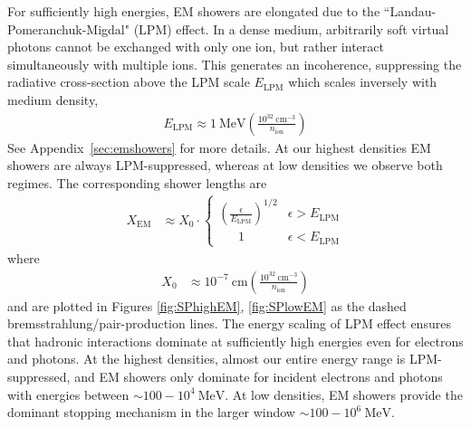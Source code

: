 \documentclass[twocolumn, preprintnumbers,amsmath,amssymb,prd, superscriptaddress]{revtex4}
\newcommand{\MeV}{\text{MeV}}
\def\r{\right)}
\def\l{\left(}
\begin{document}
For sufficiently high energies, EM showers are elongated due to the ``Landau-Pomeranchuk-Migdal" (LPM) effect.
In a dense medium, arbitrarily soft virtual photons cannot be exchanged with only one ion, but rather interact simultaneously with multiple ions.
This generates an incoherence, suppressing the radiative cross-section above the LPM scale $E_\text{LPM}$ which scales inversely with medium density,
\begin{align}
    E_\text{LPM} \approx 1~\MeV
    \l \frac{10^{32}~\text{cm}^{-3}}{n_\text{ion}} \r
\end{align}
See Appendix~\ref{sec:emshowers} for more details.
At our highest densities EM showers are always LPM-suppressed, whereas at low densities we observe both regimes.
The corresponding shower lengths are
\begin{align}
  X_\text{EM} &\approx X_0 \cdot \begin{cases}
  \l \frac{\epsilon}{E_\text{LPM}} \r^{1/2} & \epsilon > E_\text{LPM} \\
  \;\;\;\;\;\, 1 & \epsilon < E_\text{LPM}
  \end{cases}
\end{align}
where
\begin{align}
  X_0 &\approx 10^{-7} ~\text{cm}
  \l\frac{10^{32}~\text{cm}^{-3}}{n_\text{ion}}\r
\end{align}
and are plotted in Figures \ref{fig:SPhighEM}, \ref{fig:SPlowEM} as the dashed bremsstrahlung/pair-production lines.
The energy scaling of LPM effect ensures that hadronic interactions dominate at sufficiently high energies even for electrons and photons.
At the highest densities, almost our entire energy range is LPM-suppressed, and EM showers only dominate for incident electrons and photons with energies between $ \sim 100 - 10^4~\text{MeV}$.
At low densities, EM showers provide the dominant stopping mechanism in the larger window $ \sim 100 - 10^6~\MeV$.
\end{document}
